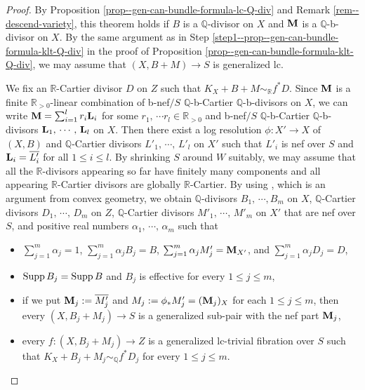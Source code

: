\documentclass[12pt]{amsart}
\theoremstyle{definition}
\begin{document}
\begin{proof}
By Proposition \ref{prop--gen-can-bundle-formula-lc-Q-div} and Remark \ref{rem--descend-variety}, this theorem holds if $B$ is a $\mathbb{Q}$-divisor on $X$ and $\boldsymbol{\rm M}$ is a $\mathbb{Q}$-b-divisor on $X$. 
By the same argument as in Step \ref{step1--prop--gen-can-bundle-formula-klt-Q-div} in the proof of Proposition \ref{prop--gen-can-bundle-formula-klt-Q-div}, we may assume that $(X,B+M) \to S$ is generalized lc. 

We fix an $\mathbb{R}$-Cartier divisor $D$ on $Z$ such that $K_{X}+B+M \sim_{\mathbb{R}}f^{*}D$. 
Since $\boldsymbol{\rm M}$ is a finite $\mathbb{R}_{>0}$-linear combination of b-nef$/S$ $\mathbb{Q}$-b-Cartier $\mathbb{Q}$-b-divisors on $X$, we can write $\boldsymbol{\rm M}=\sum_{i=1}^{l} r_{i}\boldsymbol{\rm L}_{i}$ for some $r_{1},\,\cdots r_{l} \in \mathbb{R}_{>0}$ and b-nef$/S$ $\mathbb{Q}$-b-Cartier $\mathbb{Q}$-b-divisors $\boldsymbol{\rm L}_{1},\,\cdots,\,\boldsymbol{\rm L}_{l}$ on $X$.  
Then there exist a log resolution $\phi \colon X' \to X$ of $(X,B)$ and $\mathbb{Q}$-Cartier divisors $L'_{1},\,\cdots,\,L'_{l}$ on $X'$ such that $L'_{i}$ is nef over $S$ and $\boldsymbol{\rm L}_{i}=\overline{L'_{i}}$ for all $1 \leq i \leq l$. 
By shrinking $S$ around $W$ suitably, we may assume that all the $\mathbb{R}$-divisors appearing so far have  finitely many components and all appearing $\mathbb{R}$-Cartier divisors are globally $\mathbb{R}$-Cartier. 
By using \cite[Proof of Lemma 5.4]{fujino-hashizume-adjunction}, which is an argument from convex geometry, we obtain $\mathbb{Q}$-divisors $B_{1},\,\cdots, B_{m}$ on $X$, $\mathbb{Q}$-Cartier divisors $D_{1},\,\cdots,\,D_{m}$ on $Z$, $\mathbb{Q}$-Cartier divisors $M'_{1},\,\cdots,\,M'_{m}$ on $X'$ that are nef over $S$, and positive real numbers $\alpha_{1},\,\cdots,\,\alpha_{m}$ such that
\begin{itemize}
\item
$\sum_{j=1}^{m}\alpha_{j}=1$, $\sum_{j=1}^{m}\alpha_{j}B_{j}=B$, $\sum_{j=1}^{m}\alpha_{j}M'_{j}=\boldsymbol{\rm M}_{X'}$, and $\sum_{j=1}^{m}\alpha_{j}D_{j}=D$, 
\item
${\rm Supp}\,B_{j} = {\rm Supp}\,B$ and $B_{j}$ is effective for every $1 \leq j \leq m$, 
\item
if we put $\boldsymbol{\rm M}_{j}:=\overline{M'_{j}}$ and $M_{j}:=\phi_{*}M'_{j}=(\boldsymbol{\rm M}_{j})_{X}$ for each $1 \leq j \leq m$, then every $(X,B_{j}+M_{j}) \to S$ is a generalized sub-pair with the nef part $\boldsymbol{\rm M}_{j}$, 
\item
every $f \colon (X,B_{j}+M_{j}) \to Z$ is a generalized lc-trivial fibration over $S$ such that $K_{X}+B_{j}+M_{j} \sim_{\mathbb{Q}}f^{*}D_{j}$ for every $1\leq j \leq m$. 
\end{itemize}


\end{proof}
\end{document}
